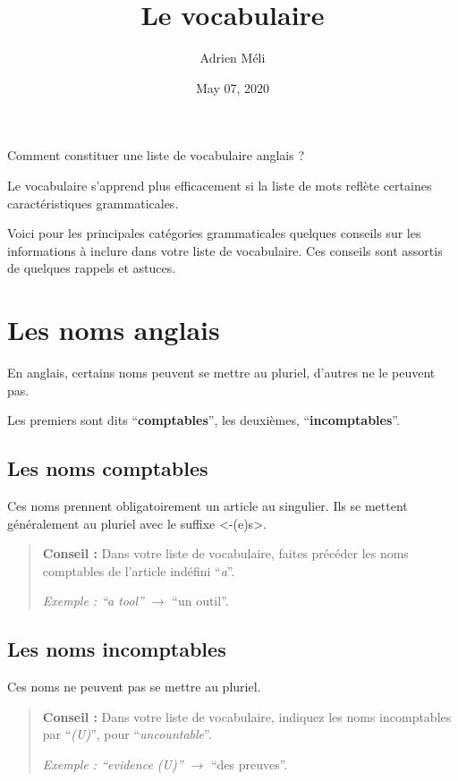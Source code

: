 \documentclass[
  10pt,
]{article}
\title{Le vocabulaire}
\author{Adrien Méli}
\date{May 07, 2020}
\begin{document}
\maketitle

{
\setcounter{tocdepth}{1}
\tableofcontents
}
Comment constituer une liste de vocabulaire anglais ?

Le vocabulaire s'apprend plus efficacement si la liste de mots reflète certaines caractéristiques grammaticales.

Voici pour les principales catégories grammaticales quelques conseils sur les informations à inclure dans votre liste de vocabulaire.
Ces conseils sont assortis de quelques rappels et astuces.

\hypertarget{les-noms-anglais}{%
\section{Les noms anglais}\label{les-noms-anglais}}

En anglais, certains noms peuvent se mettre au pluriel, d'autres ne le peuvent pas.

Les premiers sont dits ``\textbf{comptables}'', les deuxièmes, ``\textbf{incomptables}''.

\hypertarget{les-noms-comptables}{%
\subsection{Les noms comptables}\label{les-noms-comptables}}

Ces noms prennent obligatoirement un article au singulier.
Ils se mettent généralement au pluriel avec le suffixe \textless-(e)s\textgreater.

\begin{quote}
\textbf{Conseil :} Dans votre liste de vocabulaire, faites précéder les noms comptables de l'article indéfini ``\emph{a}''.

\emph{Exemple : ``a tool'' \(\rightarrow\)} ``un outil''.
\end{quote}

\hypertarget{les-noms-incomptables}{%
\subsection{Les noms incomptables}\label{les-noms-incomptables}}

Ces noms ne peuvent pas se mettre au pluriel.

\begin{quote}
\textbf{Conseil :} Dans votre liste de vocabulaire, indiquez les noms incomptables par ``\emph{(U)}'', pour ``\emph{uncountable}''.

\emph{Exemple : ``evidence (U)'' \(\rightarrow\)} ``des preuves''.
\end{quote}
\end{document}
